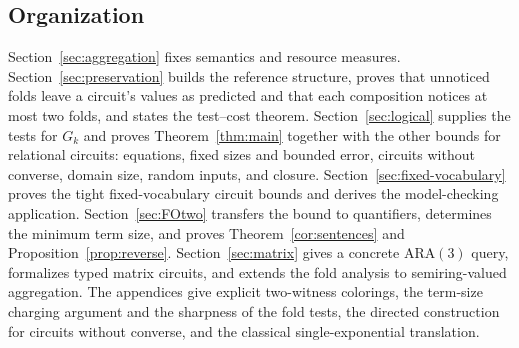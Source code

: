 \subsection{Organization}
Section~\ref{sec:aggregation} fixes semantics and resource measures.
Section~\ref{sec:preservation} builds the reference structure, proves
that unnoticed folds leave a circuit's values as predicted and that each
composition notices at most two folds, and states the test--cost
theorem. Section~\ref{sec:logical} supplies the tests for $G_k$ and
proves Theorem~\ref{thm:main} together with the other bounds for
relational circuits: equations, fixed sizes and bounded error, circuits
without converse, domain size, random inputs, and closure.
Section~\ref{sec:fixed-vocabulary} proves the tight fixed-vocabulary
circuit bounds and derives the model-checking application.
Section~\ref{sec:FOtwo} transfers the bound to quantifiers, determines
the minimum term size, and proves Theorem~\ref{cor:sentences} and
Proposition~\ref{prop:reverse}. Section~\ref{sec:matrix} gives a concrete ARA$(3)$ query,
formalizes typed matrix circuits, and extends the fold analysis to
semiring-valued aggregation.
The appendices
give explicit two-witness colorings, the term-size charging argument and
the sharpness of the fold tests, the directed construction for circuits
without converse, and the classical single-exponential translation.
